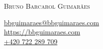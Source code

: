 {\huge \textsc{Bruno Barcarol Guimarães}}

{\scriptsize {}}
\vspace{-3\baselineskip}
\begin{flushright}
    \href{mailto:bbguimaraes@bbguimaraes.com}{bbguimaraes@bbguimaraes.com} \\
    \url{https://bbguimaraes.com} \\
    \href{tel:+420722289709}{+420 722 289 709}
\end{flushright}

